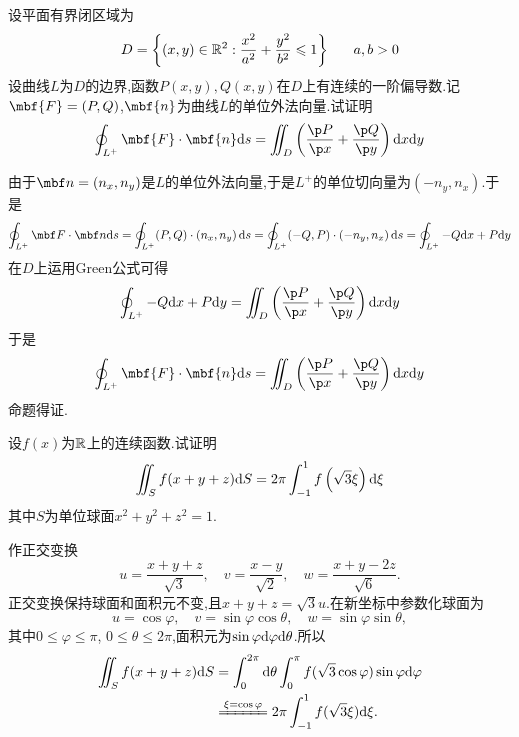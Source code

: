 \documentclass{ctexart}
\begin{document}
\begin{problem}[8.(10\songti{分})]
    设平面有界闭区域为
    \[D=\left\{(x,y)\in\R^2:\dfrac{x^2}{a^2}+\dfrac{y^2}{b^2}\leqslant1\right\}\ \ \ \ \ a,b>0\]
    设曲线$L$为$D$的边界,函数$P(x,y),Q(x,y)$在$D$上有连续的一阶偏导数.记$\mbf{F}=(P,Q)$,$\mbf{n}$为曲线$L$的单位外法向量.试证明
    \[\oint_{L^+}\mbf{F}\cdot\mbf{n}\di s=\iint_{D}\left(\dfrac{\p P}{\p x}+\dfrac{\p Q}{\p y}\right)\di x\di y\]
\end{problem}
\begin{solution}
    由于$\mbf n=\left(n_x,n_y\right)$是$L$的单位外法向量,于是$L^+$的单位切向量为$\left(-n_y,n_x\right)$.于是
    \[\oint_{L^+}\mbf F\cdot\mbf n\di s
    =\oint_{L^+}(P,Q)\cdot\left(n_x,n_y\right)\di s
    =\oint_{L^+}(-Q,P)\cdot\left(-n_y,n_x\right)\di s
    =\oint_{L^+}-Q\di x+P\di y\]
    在$D$上运用Green公式可得
    \[\oint_{L^+}-Q\di x+P\di y=\iint_D\left(\dfrac{\p P}{\p x}+\dfrac{\p Q}{\p y}\right)\di x\di y\]
    于是
    \[\oint_{L^+}\mbf{F}\cdot\mbf{n}\di s=\iint_{D}\left(\dfrac{\p P}{\p x}+\dfrac{\p Q}{\p y}\right)\di x\di y\]
    命题得证.
\end{solution}
\begin{problem}[9.(10\songti{分})]
    设$f(x)$为$\mathbb{R}$上的连续函数.试证明
    \[\iint_{S}f(x+y+z)\mathrm{d} S=2\pi\int_{-1}^{1}f\left(\sqrt{3}\xi\right)\mathrm{d}\xi\]
    其中$S$为单位球面$x^2+y^2+z^2=1$.
\end{problem}
\begin{solution}
作正交变换
    \[u=\dfrac{x+y+z}{\sqrt3},\quad v=\dfrac{x-y}{\sqrt2},\quad w=\dfrac{x+y-2z}{\sqrt6}.\]
    正交变换保持球面和面积元不变,且$x+y+z=\sqrt3u$.在新坐标中参数化球面为
    \[u=\cos\varphi,\quad v=\sin\varphi\cos\theta,\quad w=\sin\varphi\sin\theta,\]
    其中$0\leqslant\varphi\leqslant\pi$, $0\leqslant\theta\leqslant2\pi$,面积元为$\sin\varphi\mathrm{d}\varphi\mathrm{d}\theta$.所以
    \[\begin{aligned}
        \iint_Sf(x+y+z)\di S
        &=\int_0^{2\pi}\di\theta\int_0^\pi f(\sqrt3\cos\varphi)\sin\varphi\di\varphi\\
        &\xlongequal{\xi=\cos\varphi}2\pi\int_{-1}^1f(\sqrt3\xi)\di\xi.
    \end{aligned}\]
\end{solution}
\end{document}
